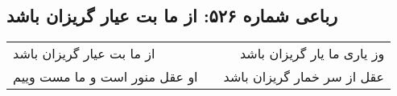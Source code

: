 \begin{center}
\section*{رباعی شماره ۵۲۶: از ما بت عیار گریزان باشد}
\label{sec:0526}
\begin{longtable}{l p{0.5cm} r}
از ما بت عیار گریزان باشد
&&
وز یاری ما یار گریزان باشد
\\
او عقل منور است و ما مست وییم
&&
عقل از سر خمار گریزان باشد
\\
\end{longtable}
\end{center}
